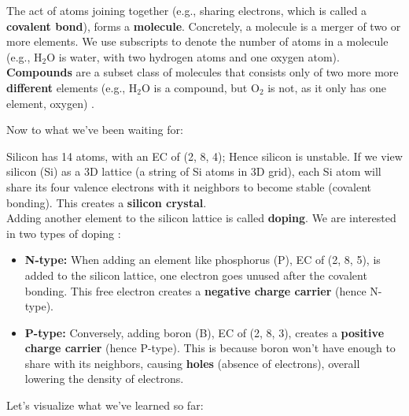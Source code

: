 \begin{Def}

    \label{def:chemical_bonds}

    The act of atoms joining together (e.g., sharing electrons, which is called a \textbf{covalent bond}), forms a \textbf{molecule}. 
    Concretely, a molecule is a merger of two or more elements. We use subscripts to denote the number of atoms in a molecule (e.g., H$_2$O is water, with two hydrogen atoms and one oxygen atom).
    \textbf{Compounds} are a subset class of molecules that consists only of two more more \textbf{different} elements (e.g., H$_2$O is a compound, but O$_2$ is not, as it only has one element, oxygen)  \cite{breslyn2013molecule}.
\end{Def}
\noindent
Now to what we've been waiting for:
\begin{Def}

    \label{def:doping}

    Silicon has 14 atoms, with an EC of (2, 8, 4); Hence silicon is unstable. If we view silicon (Si) as a 3D lattice (a string of Si atoms in 3D grid),
    each Si atom will share its four valence electrons with it neighbors to become stable (covalent bonding). This creates a \textbf{silicon crystal}.\\

    \noindent
    Adding another element to the silicon lattice is called \textbf{doping}. We 
    are interested in two types of doping \cite{engineermindset2024mosfet}:
    \begin{itemize}
        \item \textbf{N-type:} When adding an element like phosphorus (P), EC of (2, 8, 5), is added to the silicon lattice, one electron goes unused after the covalent bonding. This free electron creates a \textbf{negative charge carrier} (hence N-type).
        \item \textbf{P-type:} Conversely, adding boron (B), EC of (2, 8, 3), creates a \textbf{positive charge carrier} (hence P-type). This is because boron won't have 
        enough to share with its neighbors, causing \textbf{holes} (absence of electrons), overall lowering the density of electrons.
    \end{itemize}
\end{Def}

\newpage 

\noindent 
Let's visualize what we've learned so far:

